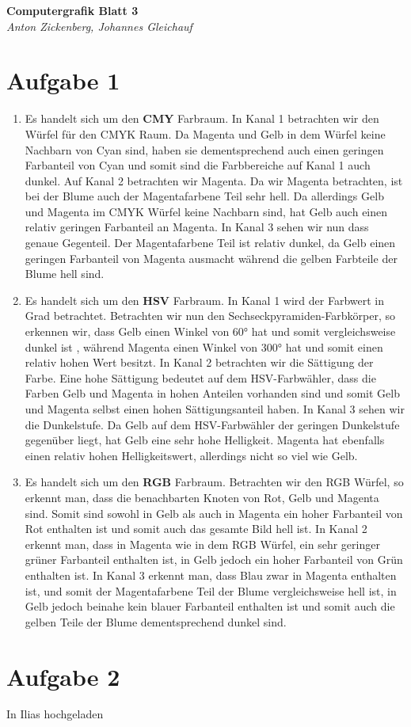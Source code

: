 \documentclass[a4paper]{article}
\begin{document}
\begin{center}
 \textbf{\Large Computergrafik Blatt 3}\\
 \emph{Anton Zickenberg, Johannes Gleichauf}
\end{center}

\section*{Aufgabe 1}
\begin{enumerate}
\item Es handelt sich um den \textbf{CMY} Farbraum. In Kanal 1 betrachten wir den Würfel für den CMYK Raum. Da Magenta und Gelb in dem Würfel keine Nachbarn von Cyan sind, haben sie dementsprechend auch einen geringen Farbanteil von Cyan und somit sind die Farbbereiche auf Kanal 1 auch dunkel. Auf Kanal 2 betrachten wir Magenta. Da wir Magenta betrachten, ist bei der Blume auch der Magentafarbene Teil sehr hell. Da allerdings Gelb und Magenta im CMYK Würfel keine Nachbarn sind, hat Gelb auch einen relativ geringen Farbanteil an Magenta. In Kanal 3 sehen wir nun dass genaue Gegenteil. Der Magentafarbene Teil ist relativ dunkel, da Gelb einen geringen Farbanteil von Magenta ausmacht während die gelben Farbteile der Blume hell sind.

\item Es handelt sich um den \textbf{HSV} Farbraum. In Kanal 1 wird der Farbwert in Grad betrachtet. Betrachten wir nun den Sechseckpyramiden-Farbkörper, so erkennen wir, dass Gelb einen Winkel von 60° hat und somit vergleichsweise dunkel ist , während Magenta einen Winkel von 300° hat und somit einen relativ hohen Wert besitzt. In Kanal 2 betrachten wir die Sättigung der Farbe. Eine hohe Sättigung bedeutet auf dem HSV-Farbwähler, dass die Farben Gelb und Magenta in hohen Anteilen vorhanden sind und somit Gelb und Magenta selbst einen hohen Sättigungsanteil haben. In Kanal 3 sehen wir die Dunkelstufe. Da Gelb auf dem HSV-Farbwähler der geringen Dunkelstufe gegenüber liegt, hat Gelb eine sehr hohe Helligkeit. Magenta hat ebenfalls einen relativ hohen Helligkeitswert, allerdings nicht so viel wie Gelb.

\item Es handelt sich um den \textbf{RGB} Farbraum.  Betrachten wir den RGB Würfel, so erkennt man, dass die benachbarten Knoten von Rot, Gelb und Magenta sind. Somit sind sowohl in Gelb als auch in Magenta ein hoher Farbanteil von Rot enthalten ist und somit auch das gesamte Bild hell ist. In Kanal 2 erkennt man, dass in Magenta wie in dem RGB Würfel, ein sehr geringer grüner Farbanteil enthalten ist, in Gelb jedoch ein hoher Farbanteil von Grün enthalten ist. In Kanal 3 erkennt man, dass Blau zwar in Magenta enthalten ist, und somit der Magentafarbene Teil der Blume vergleichsweise hell ist, in Gelb jedoch beinahe kein blauer Farbanteil enthalten ist und somit auch die gelben Teile der Blume dementsprechend dunkel sind.
\end{enumerate}

\section*{Aufgabe 2}
In Ilias hochgeladen
\end{document}

